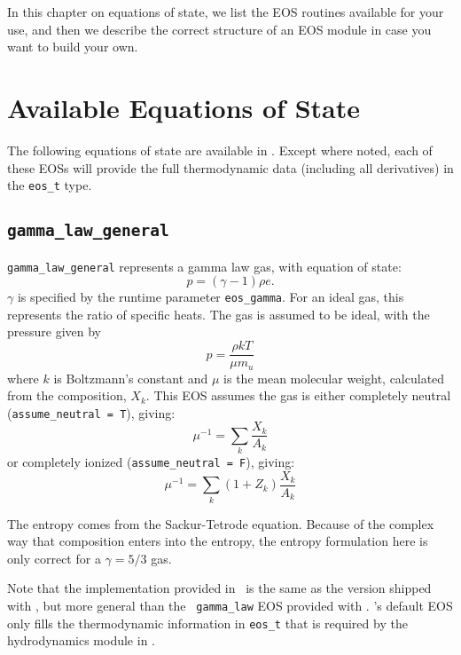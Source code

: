 
In this chapter on equations of state, we list the EOS routines
available for your use, and then we describe the correct structure of
an EOS module in case you want to build your own.

\section{Available Equations of State}

The following equations of state are available in \microphysics.
Except where noted, each of these EOSs will provide the full
thermodynamic data (including all derivatives) in the {\tt eos\_t}
type.



\subsection {\tt gamma\_law\_general}

{\tt gamma\_law\_general} represents a gamma law gas, with
  equation of state:
\begin{equation}
  p = (\gamma - 1) \rho e.
\end{equation}
$\gamma$ is specified by the runtime parameter {\tt eos\_gamma}.  For
an ideal gas, this represents the ratio of specific heats.  The gas is
assumed to be ideal, with the pressure given by
\begin{equation}
p = \frac{\rho k T}{\mu m_u}
\end{equation}
where $k$ is Boltzmann's constant and $\mu$ is the mean molecular
weight, calculated from the composition, $X_k$.  This EOS assumes
the gas is either completely neutral ({\tt assume\_neutral = T}),
giving:
\begin{equation}
\mu^{-1} = \sum_k \frac{X_k}{A_k}
\end{equation}
or completely ionized ({\tt assume\_neutral = F}), giving:
\begin{equation}
\mu^{-1} = \sum_k \left ( 1 + Z_k \right ) \frac{X_k}{A_k}
\end{equation}

The entropy comes from the Sackur-Tetrode equation.  Because of the
complex way that composition enters into the entropy, the entropy
formulation here is only correct for a $\gamma = 5/3$ gas.

Note that the implementation provided in \microphysics\ is the same as
the version shipped with \maestro, but more general than the {\tt
  gamma\_law} EOS provided with \castro.  \castro's default EOS only
fills the thermodynamic information in {\tt eos\_t} that is required
by the hydrodynamics module in \castro.



